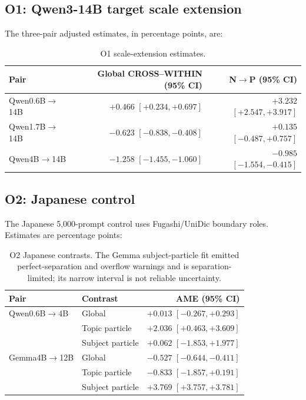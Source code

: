 \documentclass[11pt]{article}
\begin{document}
\subsection{O1: Qwen3-14B target scale extension}

The three-pair adjusted estimates, in percentage points, are:

\begin{table}[t]
\centering
\small
\begin{tabular}{lrr}
\toprule
Pair & Global CROSS--WITHIN (95\% CI) & N$\rightarrow$P (95\% CI) \\
\midrule
Qwen0.6B$\rightarrow$14B & $+0.466$ $[+0.234,+0.697]$ & $+3.232$ $[+2.547,+3.917]$ \\
Qwen1.7B$\rightarrow$14B & $-0.623$ $[-0.838,-0.408]$ & $+0.135$ $[-0.487,+0.757]$ \\
Qwen4B$\rightarrow$14B & $-1.258$ $[-1.455,-1.060]$ & $-0.985$ $[-1.554,-0.415]$ \\
\bottomrule
\end{tabular}
\caption{O1 scale-extension estimates.}
\label{tab:o1}
\end{table}

\subsection{O2: Japanese control}

The Japanese 5,000-prompt control uses Fugashi/UniDic boundary roles.
Estimates are percentage points:

\begin{table}[t]
\centering
\small
\begin{tabular}{llr}
\toprule
Pair & Contrast & AME (95\% CI) \\
\midrule
Qwen0.6B$\rightarrow$4B & Global & $+0.013$ $[-0.267,+0.293]$ \\
 & Topic particle & $+2.036$ $[+0.463,+3.609]$ \\
 & Subject particle & $+0.062$ $[-1.853,+1.977]$ \\
Gemma4B$\rightarrow$12B & Global & $-0.527$ $[-0.644,-0.411]$ \\
 & Topic particle & $-0.833$ $[-1.857,+0.191]$ \\
 & Subject particle & $+3.769$ $[+3.757,+3.781]$ \\
\bottomrule
\end{tabular}
\caption{O2 Japanese contrasts. The Gemma subject-particle fit emitted
perfect-separation and overflow warnings and is separation-limited; its
narrow interval is not reliable uncertainty.}
\label{tab:o2}
\end{table}
\end{document}
